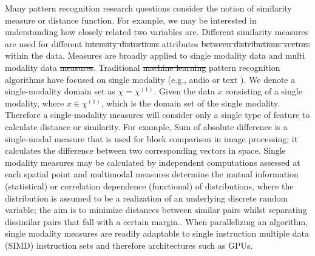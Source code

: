 \documentclass[10pt]{article}[draft]
\begin{document}
\begin{itemize}
		Many pattern recognition research questions consider the notion of similarity measure or distance function. For example, we may be interested in understanding how closely related two variables are. Different similarity measures are used for different \st{intensity distortions} attributes \st{between distributions vectors} within the data. Measures are broadly applied to single modality data and multi modality data \st{measures}.  Traditional \st{machine learning} pattern recognition algorithms have focused on single modality (e.g., audio  or text ). We denote a single-modality domain set as $\chi =  \chi^{(1)} $. Given the data $x$ consisting of a single modality, where $x \in \chi^{(1)}$, which is the domain set of the single modality.  Therefore a single-modality measures will consider only a single type of feature to calculate distance or similarity.  For example, Sum of absolute difference is a single-modal measure that is used for block comparison in image processing; it calculates the difference between two corresponding vectors in space. Single modality measures may be calculated by independent computations assessed at each spatial point and multimodal measures determine the mutual information (statistical) or correlation dependence (functional) of distributions, where the  distribution is assumed to be a realization of an underlying discrete random variable; the aim is to minimize distances between similar pairs whilst separating dissimilar pairs that fall with a certain margin.. When parallelizing an algorithm, single modality measures are readily adaptable to single instruction multiple data (SIMD) instruction sets and therefore architectures such as GPUs.  
		

\end{itemize}
\end{document}
